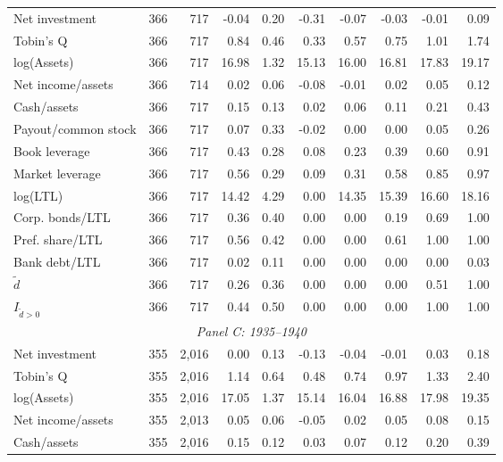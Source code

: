 \begin{table}[p]
\begin{threeparttable}
\begin{tabular}{lrrrrrrrrr}
            \midrule
            Net investment & 366 & 717 & -0.04 & 0.20 & -0.31 & -0.07 & -0.03 & -0.01 & 0.09 \\
            Tobin's Q & 366 & 717 & 0.84 & 0.46 & 0.33 & 0.57 & 0.75 & 1.01 & 1.74 \\
            log(Assets) & 366 & 717 & 16.98 & 1.32 & 15.13 & 16.00 & 16.81 & 17.83 & 19.17 \\
            Net income/assets & 366 & 714 & 0.02 & 0.06 & -0.08 & -0.01 & 0.02 & 0.05 & 0.12 \\
            Cash/assets & 366 & 717 & 0.15 & 0.13 & 0.02 & 0.06 & 0.11 & 0.21 & 0.43 \\
            Payout/common stock & 366 & 717 & 0.07 & 0.33 & -0.02 & 0.00 & 0.00 & 0.05 & 0.26 \\
            Book leverage & 366 & 717 & 0.43 & 0.28 & 0.08 & 0.23 & 0.39 & 0.60 & 0.91 \\
            Market leverage & 366 & 717 & 0.56 & 0.29 & 0.09 & 0.31 & 0.58 & 0.85 & 0.97 \\
            log(LTL) & 366 & 717 & 14.42 & 4.29 & 0.00 & 14.35 & 15.39 & 16.60 & 18.16 \\
            Corp. bonds/LTL & 366 & 717 & 0.36 & 0.40 & 0.00 & 0.00 & 0.19 & 0.69 & 1.00 \\
            Pref. share/LTL & 366 & 717 & 0.56 & 0.42 & 0.00 & 0.00 & 0.61 & 1.00 & 1.00 \\
            Bank debt/LTL & 366 & 717 & 0.02 & 0.11 & 0.00 & 0.00 & 0.00 & 0.00 & 0.03 \\
            \ensuremath{\tilde{d}} & 366 & 717 & 0.26 & 0.36 & 0.00 & 0.00 & 0.00 & 0.51 & 1.00 \\
            \ensuremath{I_{\tilde{d}>0}} & 366 & 717 & 0.44 & 0.50 & 0.00 & 0.00 & 0.00 & 1.00 & 1.00 \\
            \midrule
            \multicolumn{10}{c}{\textit{Panel C: 1935--1940}} \\
            \midrule
            Net investment & 355 & 2,016 & 0.00 & 0.13 & -0.13 & -0.04 & -0.01 & 0.03 & 0.18 \\
            Tobin's Q & 355 & 2,016 & 1.14 & 0.64 & 0.48 & 0.74 & 0.97 & 1.33 & 2.40 \\
            log(Assets) & 355 & 2,016 & 17.05 & 1.37 & 15.14 & 16.04 & 16.88 & 17.98 & 19.35 \\
            Net income/assets & 355 & 2,013 & 0.05 & 0.06 & -0.05 & 0.02 & 0.05 & 0.08 & 0.15 \\
            Cash/assets & 355 & 2,016 & 0.15 & 0.12 & 0.03 & 0.07 & 0.12 & 0.20 & 0.39 \\

\end{tabular}
\end{threeparttable}
\end{table}
